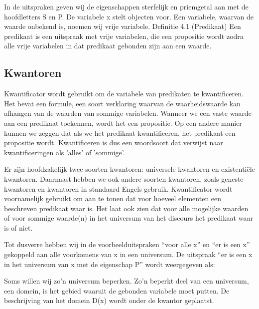 \documentclass{article}
\begin{document}
	
	In de uitspraken geven wij de eigenschappen sterfelijk en priemgetal aan met de hoofdletters
	S en P. De variabele x stelt objecten voor. Een variabele, waarvan de waarde onbekend
	is, noemen wij vrije variabele.
	Definitie 4.1 (Predikaat) Een predikaat is een uitspraak met vrije variabelen, die een
	propositie wordt zodra alle vrije variabelen in dat predikaat gebonden zijn aan een waarde.
	
	\subsection{Kwantoren}
	
	Kwantificator wordt gebruikt om de variabele van predikaten te kwantificeren. Het bevat een formule, een soort verklaring waarvan de waarheidswaarde kan afhangen van de waarden van sommige variabelen. Wanneer we een vaste waarde aan een predikaat toekennen, wordt het een propositie. Op een andere manier kunnen we zeggen dat als we het predikaat kwantificeren, het predikaat een propositie wordt. Kwantificeren is dus een woordsoort dat verwijst naar kwantificeringen als 'alles' of 'sommige'.
	
	Er zijn hoofdzakelijk twee soorten kwantoren: universele kwantoren en existentiële kwantoren. Daarnaast hebben we ook andere soorten kwantoren, zoals geneste kwantoren en kwantoren in standaard Engels gebruik. Kwantificator wordt voornamelijk gebruikt om aan te tonen dat voor hoeveel elementen een beschreven predikaat waar is. Het laat ook zien dat voor alle mogelijke waarden of voor sommige waarde(n) in het universum van het discours het predikaat waar is of niet.
	
	
	Tot dusverre hebben wij in de voorbeelduitspraken “voor alle x” en “er is een x” gekoppeld
	aan alle voorkomens van x in een universum. De uitspraak “er is een x in het
	universum van x met de eigenschap P” wordt weergegeven als:
	
	
	Soms willen wij zo’n universum beperken. Zo’n beperkt deel van een universum, een
	domein, is het gebied waaruit de gebonden variabele moet putten. De beschrijving van
	het domein D(x) wordt onder de kwantor geplaatst.
	
\end{document}
